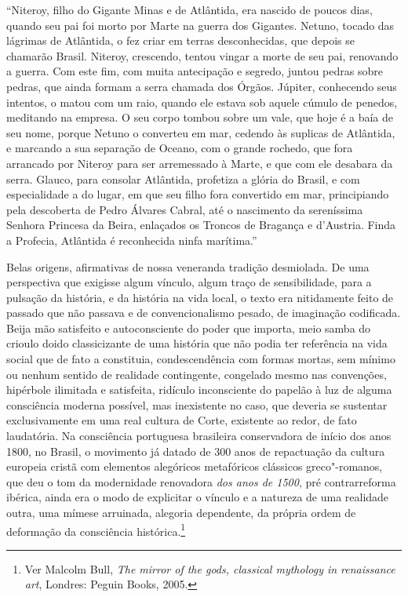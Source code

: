 ``Niteroy, filho do Gigante Minas e de Atlântida, era nascido de poucos
dias, quando seu pai foi morto por Marte na guerra dos Gigantes. Netuno,
tocado das lágrimas de Atlântida, o fez criar em terras desconhecidas,
que depois se chamarão Brasil. Niteroy, crescendo, tentou vingar a morte
de seu pai, renovando a guerra. Com este fim, com muita antecipação e
segredo, juntou pedras sobre pedras, que ainda formam a serra chamada
dos Órgãos. Júpiter, conhecendo seus intentos, o matou com um raio,
quando ele estava sob aquele cúmulo de penedos, meditando na empresa. O
seu corpo tombou sobre um vale, que hoje é a baía de seu nome, porque
Netuno o converteu em mar, cedendo às suplicas de Atlântida, e marcando
a sua separação de Oceano, com o grande rochedo, que fora arrancado por
Niteroy para ser arremessado à Marte, e que com ele desabara da serra.
Glauco, para consolar Atlântida, profetiza a glória do Brasil, e com
especialidade a do lugar, em que seu filho fora convertido em mar,
principiando pela descoberta de Pedro Álvares Cabral, até o nascimento
da sereníssima Senhora Princesa da Beira, enlaçados os Troncos de
Bragança e d'Austria. Finda a Profecia, Atlântida é reconhecida ninfa
marítima.''

Belas origens, afirmativas de nossa veneranda tradição desmiolada. De
uma perspectiva que exigisse algum vínculo, algum traço de
sensibilidade, para a pulsação da história, e da história na vida local,
o texto era nitidamente feito de passado que não passava e de
convencionalismo pesado, de imaginação codificada. Beija mão satisfeito
e autoconsciente do poder que importa, meio samba do crioulo doido
classicizante de uma história que não podia ter referência na vida
social que de fato a constituia, condescendência com formas mortas, sem
mínimo ou nenhum sentido de realidade contingente, congelado mesmo nas
convenções, hipérbole ilimitada e satisfeita, ridículo inconsciente do
papelão à luz de alguma consciência moderna possível, mas inexistente no
caso, que deveria se sustentar exclusivamente em uma real cultura de
Corte, existente ao redor, de fato laudatória. Na consciência portuguesa
brasileira conservadora de início dos anos 1800, no Brasil, o movimento
já datado de 300 anos de repactuação da cultura europeia cristã com
elementos alegóricos metafóricos clássicos greco"-romanos, que deu o tom
da modernidade renovadora \emph{dos anos de 1500}, pré contrarreforma
ibérica, ainda era o modo de explicitar o vínculo e a natureza de uma
realidade outra, uma mímese arruinada, alegoria dependente, da própria
ordem de deformação da consciência histórica.\footnote{Ver Malcolm Bull,
  \emph{The mirror of the gods, classical mythology in renaissance art},
  Londres: Peguin Books, 2005.}

